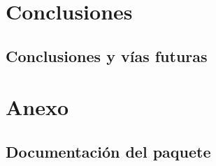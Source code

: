 \documentclass[oneside,openany,titlepage,dottedtoc,headinclude,%
               footinclude=true,cleardoublepage=empty,abstractoff, %
               paper=a4,fontsize=11pt,%
               ]{scrreprt}
\begin{document}
\part{Conclusiones}
\chapter{Conclusiones y vías futuras}
 
\appendix
\part*{Anexo}
  \chapter{Documentación del paquete}
    


\end{document}
